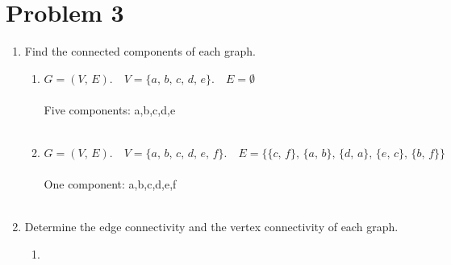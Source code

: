\documentclass{amsart}
\theoremstyle{definition}
\theoremstyle{Exercise}
\theoremstyle{remark}
\theoremstyle{rule}
\numberwithin{equation}{section}
\begin{document}
\section*{Problem 3}

\begin{enumerate}[label=(\alph*)]
\item Find the connected components of each graph.\\
    \begin{enumerate}[label=(\roman*)]
    \item $G = (V, \,E).\quad V = \{a,\, b,\, c,\, d,\,  e\}.\quad E = \emptyset$\\\\
    Five components: {a},{b},{c},{d},{e}
\\\\
    \item $G = (V,\, E).\quad V = \{a,\, b,\, c,\, d,\, e,\, f\}.\quad E = \{ \{c,\, f\}, \,\{a,\, b\},\, \{d,\, a\}, \,\{e,\, c\},\, \{b,\, f\} \}$\\\\
    One component: {a,b,c,d,e,f}
\\\\
    \end{enumerate}
\item Determine the edge connectivity and the vertex connectivity of each graph.\\

    \begin{enumerate}[label=(\roman*)]    
 \item
{}
\end{enumerate}
\end{enumerate}
\end{document}
